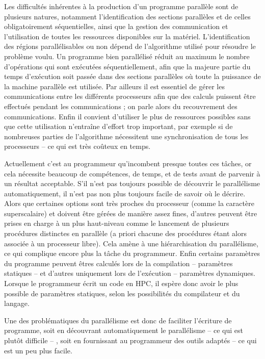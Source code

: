 Les difficultés inhérentes à la production d'un programme parallèle sont de plusieurs natures, notamment l'identification des sections parallèles et de celles obligatoirement séquentielles, ainsi que la gestion des communication et l'utilisation de toutes les ressources disponibles sur la matériel. L'identification des régions parallélisables ou non dépend de l'algorithme utilisé pour résoudre le problème voulu. Un programme bien parallélisé réduit au maximum le nombre d'opérations qui sont exécutées séquentiellement, afin que la majeure partie du temps d'exécution soit passée dans des sections parallèles où toute la puissance de la machine parallèle est utilisée. Par ailleurs il est essentiel de gérer les communications entre les différents processeurs afin que des calculs puissent être effectués pendant les communications ; on parle alors du recouvrement des communications. Enfin il convient d'utiliser le plus de ressources possibles sans que cette utilisation n'entraîne d'effort trop important, par exemple si de nombreuses parties de l'algorithme nécessitent une synchronisation de tous les processeurs -- ce qui est très coûteux en temps.

Actuellement c'est au programmeur qu'incombent presque toutes ces tâches, or cela nécessite beaucoup de compétences, de temps, et de tests avant de parvenir à un résultat acceptable. S'il n'est pas toujours possible de découvrir le parallélisme automatiquement, il n'est pas non plus toujours facile de savoir où le décrire. Alors que certaines options sont très proches du processeur (comme la caractère superscalaire) et doivent être gérées de manière assez fines, d'autres peuvent être prises en charge à un plus haut-niveau comme le lancement de plusieurs procédures distinctes en parallèle (a priori chacune des procédures étant alors associée à un processeur libre). Cela amène à une hiérarchisation du parallélisme, ce qui complique encore plus la tâche du programmeur. Enfin certains paramètres du programme peuvent êtres calculés lors de la compilation -- paramètres statiques -- et d'autres uniquement lors de l'exécution -- paramètres dynamiques. Lorsque le programmeur écrit un code en HPC, il espère donc avoir le plus possible de paramètres statiques, selon les possibilités du compilateur et du langage. 

Une des problématiques du parallélisme est donc de faciliter l'écriture de programme, soit en découvrant automatiquement le parallélisme -- ce qui est plutôt difficile -- , soit en fournissant au programmeur des outils adaptés -- ce qui est un peu plus facile.

